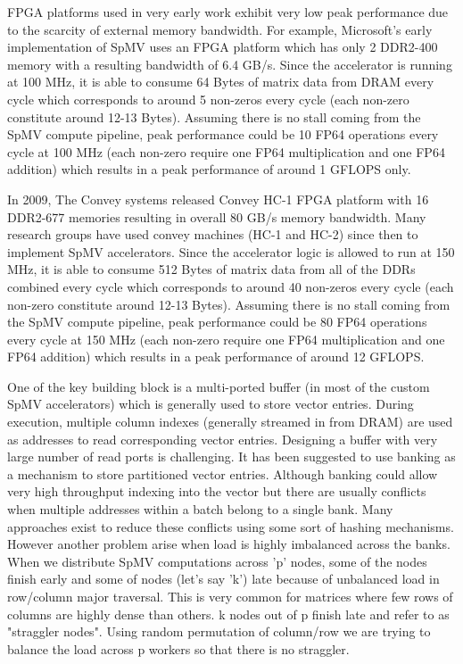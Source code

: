\documentclass[manuscript,screen]{acmart}
\begin{document}
FPGA platforms used in very early work exhibit very low peak performance due to the scarcity of external memory bandwidth. 
For example, Microsoft's early implementation of SpMV uses an FPGA platform which has only 2 DDR2-400 memory with a resulting bandwidth of 6.4 GB/s. 
Since the accelerator is running at 100 MHz, it is able to consume 64 Bytes of matrix data from DRAM every cycle which corresponds to around 5 non-zeros every cycle (each non-zero constitute around 12-13 Bytes). Assuming there is no stall coming from the SpMV compute pipeline, peak performance could be 10 FP64 operations every cycle at 100 MHz (each non-zero require one FP64 multiplication and one FP64 addition) which results in a peak performance of around 1 GFLOPS only. 

In 2009, The Convey systems released Convey HC-1 FPGA platform with 16 DDR2-677 memories resulting in overall 80 GB/s memory bandwidth.
Many research groups have used convey machines (HC-1 and HC-2) since then to implement SpMV accelerators.
Since the accelerator logic is allowed to run at 150 MHz, it is able to consume 512 Bytes of matrix data from all of the DDRs combined every cycle which corresponds to around 40 non-zeros every cycle (each non-zero constitute around 12-13 Bytes). 
Assuming there is no stall coming from the SpMV compute pipeline, peak performance could be 80 FP64 operations every cycle at 150 MHz (each non-zero require one FP64 multiplication and one FP64 addition) which results in a peak performance of around 12 GFLOPS. 

One of the key building block is a multi-ported buffer (in most of the custom SpMV accelerators) which is generally used to store vector entries. 
During execution, multiple column indexes (generally streamed in from DRAM) are used as addresses to read corresponding vector entries.
Designing a buffer with very large number of read ports is challenging. 
It has been suggested to use banking as a mechanism to store partitioned vector entries. 
Although banking could allow very high throughput indexing into the vector but there are usually conflicts when multiple addresses within a batch belong to a single bank.
Many approaches exist to reduce these conflicts using some sort of hashing mechanisms. However another problem arise when load is highly imbalanced across the banks.
When we distribute SpMV computations across 'p' nodes, some of the nodes finish early and some of nodes (let's say 'k') late because of unbalanced load in row/column major traversal. This is very common for matrices where few rows of columns are highly dense than others. k nodes out of p finish late and refer to as "straggler nodes".
Using random permutation of column/row we are trying to balance the load across p workers so that there is no straggler.
 
\end{document}
